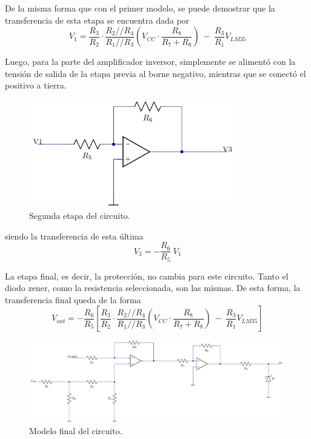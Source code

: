 \documentclass[a4paper]{article}
\begin{document}
De la misma forma que con el primer modelo, se puede demostrar que la transferencia de esta etapa se encuentra dada por
\[
	V_1 = \frac{R_3}{R_2} \cdot \frac{R_2 // R_4}{R_1 // R_3} \left( V_{CC} \cdot \frac{R_8}{R_7 + R_8} \right) \ - \ \frac{R_3}{R_1} V_{LM35}
\]

Luego, para la parte del amplificador inversor, simplemente se alimentó con la tensión de salida de la etapa previa al borne negativo, mientras que se conectó el positivo a tierra.

\begin{figure}[H]
	\centering
	\includegraphics[width=0.8\textwidth]{Ejercicio6/Imagenes/CircuitoEtapa2-M2.png}
	\caption{Segunda etapa del circuito.}
	\label{fig:cir2-M2}
\end{figure}

siendo la transferencia de esta última
\[
	V_3 = - \frac{R_6}{R_5} \ V_1
\]

La etapa final, es decir, la protección, no cambia para este circuito. Tanto el diodo zener, como la resistencia seleccionada, son las mismas. De esta forma, la transferencia final queda de la forma
\begin{equation}
	V_{out} = - \frac{R_6}{R_5} \left[ \frac{R_3}{R_2} \cdot \frac{R_2 // R_4}{R_1 // R_3} \left( V_{CC} \cdot \frac{R_8}{R_7 + R_8} \right) \ - \ \frac{R_3}{R_1} V_{LM35} \right]
	\label{equ:transfm2}
\end{equation}

\begin{figure}[H]
	\centering
	\includegraphics[width=0.99\textwidth]{Ejercicio6/Imagenes/CircuitoFinal-M2.png}
	\caption{Modelo final del circuito.}
	\label{fig:cirfin-M2}
\end{figure}
\end{document}
